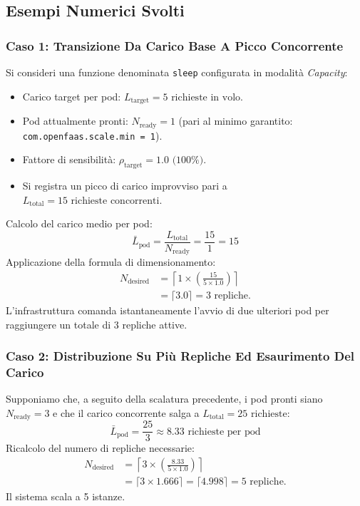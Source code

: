 \documentclass[11pt, a4paper]{article}
\begin{document}
\subsection{Esempi Numerici Svolti}

\subsubsection{Caso 1: Transizione Da Carico Base A Picco Concorrente}
Si consideri una funzione denominata \texttt{sleep} configurata in modalità \emph{Capacity}:
\begin{itemize}[noitemsep]
    \item Carico target per pod: $L_{\text{target}} = 5\text{ richieste in volo}$.
    \item Pod attualmente pronti: $N_{\text{ready}} = 1$ (pari al minimo garantito: \texttt{com.openfaas.scale.min = 1}).
    \item Fattore di sensibilità: $\rho_{\text{target}} = 1.0\text{ (100\%)}$.
    \item Si registra un picco di carico improvviso pari a $L_{\text{total}} = 15\text{ richieste concorrenti}$.
\end{itemize}

Calcolo del carico medio per pod:
\begin{equation*}
    \bar{L}_{\text{pod}} = \frac{L_{\text{total}}}{N_{\text{ready}}} = \frac{15}{1} = 15
\end{equation*}
Applicazione della formula di dimensionamento:
\begin{align*}
    N_{\text{desired}} &= \left\lceil 1 \times \left( \frac{15}{5 \times 1.0} \right) \right\rceil \\
    &= \lceil 3.0 \rceil = 3\text{ repliche}.
\end{align*}
L'infrastruttura comanda istantaneamente l'avvio di due ulteriori pod per raggiungere un totale di 3 repliche attive.

\subsubsection{Caso 2: Distribuzione Su Più Repliche Ed Esaurimento Del Carico}
Supponiamo che, a seguito della scalatura precedente, i pod pronti siano $N_{\text{ready}} = 3$ e che il carico concorrente salga a $L_{\text{total}} = 25\text{ richieste}$:
\begin{equation*}
    \bar{L}_{\text{pod}} = \frac{25}{3} \approx 8.33\text{ richieste per pod}
\end{equation*}
Ricalcolo del numero di repliche necessarie:
\begin{align*}
    N_{\text{desired}} &= \left\lceil 3 \times \left( \frac{8.33}{5 \times 1.0} \right) \right\rceil \\
    &= \lceil 3 \times 1.666 \rceil = \lceil 4.998 \rceil = 5\text{ repliche}.
\end{align*}
Il sistema scala a 5 istanze.
\end{document}
